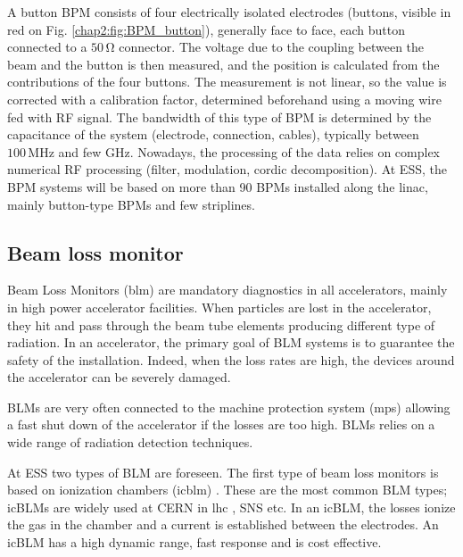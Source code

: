 \begin{refsection}
  
  A button BPM consists of four electrically isolated electrodes (buttons, visible in red on Fig. \ref{chap2:fig:BPM_button}), generally face to face, each button connected to a $50\,\mathrm{\Omega}$ connector. The voltage due to the coupling between the beam and the button is then measured, and the position is calculated from the contributions of the four buttons. The measurement is not linear, so the value is corrected with a calibration factor, determined beforehand using a moving wire fed with RF signal. The bandwidth of this type of BPM is determined by the capacitance of the system (electrode, connection, cables), typically between $100\,\mathrm{MHz}$ and few GHz. Nowadays, the processing of the data relies on complex numerical RF processing (filter, modulation, cordic decomposition). At ESS, the BPM systems will be based on more than 90 BPMs installed along the linac, mainly button-type BPMs and few striplines.

  \subsection{Beam loss monitor}
  Beam Loss Monitors (\acrshort{blm}) are mandatory diagnostics in all accelerators, mainly in high power accelerator facilities. When particles are lost in the accelerator, they hit and pass through the beam tube elements producing different type of radiation. In an accelerator, the primary goal of BLM systems is to guarantee the safety of the installation. Indeed, when the loss rates are high, the devices around the accelerator can be severely damaged.

  BLMs are very often connected to the machine protection system (\acrshort{mps}) allowing a fast shut down of the accelerator if the losses are too high. BLMs relies on a wide range of radiation detection techniques.

  At ESS two types of BLM are foreseen. The first type of beam loss monitors is based on ionization chambers (\acrshort{icblm}) \cite{Grishin:IBIC2017-WEPWC03}. These are the most common BLM types; icBLMs are widely used at CERN in \acrshort{lhc} \cite{HOLZER20122055}, SNS etc. In an icBLM, the losses ionize the gas in the chamber and a current is established between the electrodes. An icBLM has a high dynamic range, fast response and is cost effective.

  


\end{refsection}
